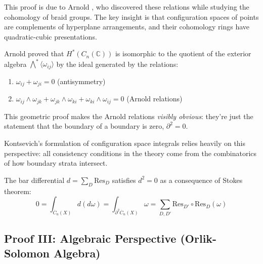 \begin{remark}
This proof is due to Arnold \cite{Arnold69}, who discovered these relations while 
studying the cohomology of braid groups. The key insight is that configuration spaces 
of points are complements of hyperplane arrangements, and their cohomology rings have 
quadratic-cubic presentations.

Arnold proved that $H^*(C_n(\mathbb{C}))$ is isomorphic to the quotient of the exterior 
algebra $\bigwedge^* \langle \omega_{ij} \rangle$ by the ideal generated by the relations:
\begin{enumerate}
\item $\omega_{ij} + \omega_{ji} = 0$ (antisymmetry)
\item $\omega_{ij} \wedge \omega_{jk} + \omega_{jk} \wedge \omega_{ki} + \omega_{ki} 
\wedge \omega_{ij} = 0$ (Arnold relations)
\end{enumerate}
\end{remark}

\begin{remark}
This geometric proof makes the Arnold relations \emph{visibly obvious}: they're just 
the statement that the boundary of a boundary is zero, $\partial^2 = 0$.

Kontsevich's formulation of configuration space integrals \cite{Kontsevich03} relies 
heavily on this perspective: all consistency conditions in the theory come from the 
combinatorics of how boundary strata intersect.
\end{remark}

\begin{corollary}
The bar differential $d = \sum_D \text{Res}_D$ satisfies $d^2 = 0$ as a consequence of 
Stokes theorem:
\begin{equation}
0 = \int_{\overline{C}_n(X)} d(d\omega) = \int_{\partial^2 \overline{C}_n(X)} \omega 
= \sum_{D, D'} \text{Res}_{D'} \circ \text{Res}_D(\omega)
\end{equation}
\end{corollary}

\subsection{Proof III: Algebraic Perspective (Orlik-Solomon Algebra)}
\label{sec:arnold-proof-algebraic}

